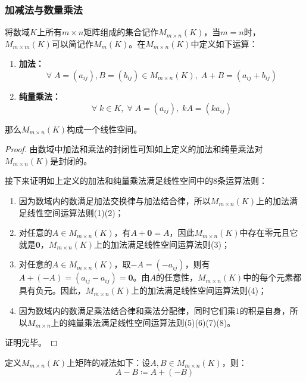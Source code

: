 \subsubsection{加减法与数量乘法}
\begin{definition}
	将数域$K$上所有$m\times n$矩阵组成的集合记作$M_{m\times n}(K)$，当$m=n$时，$M_{m\times m}(K)$可以简记作$M_m(K)$。在$M_{m\times n}(K)$中定义如下运算：
	\begin{enumerate}
		\item \textbf{加法：} 
		\begin{equation*}
			\forall\;A=(a_{ij}),B=(b_{ij})\in M_{m\times n}(K),\;A+B=(a_{ij}+b_{ij})
		\end{equation*}
		\item \textbf{纯量乘法：}
		\begin{equation*}
			\forall\;k\in K,\;\forall\;A=(a_{ij}),\;kA=(ka_{ij})
		\end{equation*}
	\end{enumerate}
	那么$M_{m\times n}(K)$构成一个线性空间。
\end{definition}
\begin{proof}
	由数域中加法和乘法的封闭性可知如上定义的加法和纯量乘法对$M_{m\times n}(K)$是封闭的。\par
	接下来证明如上定义的加法和纯量乘法满足线性空间中的$8$条运算法则：
	\begin{enumerate}
		\item 因为数域内的数满足加法交换律与加法结合律，所以$M_{m\times n}(K)$上的加法满足线性空间运算法则(1)(2)；
		\item 对任意的$A\in M_{m\times n}(K)$，有$A+\mathbf{0}=A$，因此$M_{m\times n}(K)$中存在零元且它就是$\mathbf{0}$，$M_{m\times n}(K)$上的加法满足线性空间运算法则(3)；
		\item 对任意的$A\in M_{m\times n}(K)$，取$-A=(-a_{ij})$，则有$A+(-A)=(a_{ij}-a_{ij})=\mathbf{0}$。由$A$的任意性，$M_{m\times n}(K)$中的每个元素都具有负元。因此，$M_{m\times n}(K)$上的加法满足线性空间运算法则(4)；
		\item 因为数域内的数满足乘法结合律和乘法分配律，同时它们乘$1$的积是自身，所以$M_{m\times n}$上的纯量乘法满足线性空间运算法则(5)(6)(7)(8)。
	\end{enumerate}
	证明完毕。
\end{proof}
\begin{definition}
	定义$M_{m\times n}(K)$上矩阵的减法如下：设$A,B\in M_{m\times n}(K)$，则：
	\begin{equation*}
		A-B\coloneq A+(-B)
	\end{equation*}
\end{definition}
